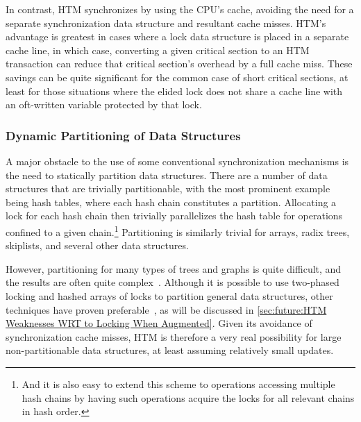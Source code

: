 In contrast, HTM synchronizes by using the CPU's cache, avoiding the need
for a separate synchronization data structure and resultant cache misses.
HTM's advantage is greatest in cases where a lock data structure is
placed in a separate cache line, in which case, converting a given
critical section to an HTM transaction can reduce that critical section's
overhead by a full cache miss.
These savings can be quite significant for the common case of short
critical sections, at least for those situations where the elided lock
does not share a cache line with an oft-written variable protected by
that lock.

\QuickQuizEnd

\subsubsection{Dynamic Partitioning of Data Structures}
\label{sec:future:Dynamic Partitioning of Data Structures}

A major obstacle to the use of some conventional synchronization mechanisms
is the need to statically partition data structures.
There are a number of data structures that are trivially
partitionable, with the most prominent example being hash tables,
where each hash chain constitutes a partition.
Allocating a lock for each hash chain then trivially parallelizes
the hash table for operations confined to a given chain.\footnote{
	And it is also easy to extend this scheme to operations accessing
	multiple hash chains by having such operations acquire the
	locks for all relevant chains in hash order.}
Partitioning is similarly trivial for arrays, radix trees, skiplists, and
several other data structures.

However, partitioning for many types of trees and graphs is quite
difficult, and the results are often quite complex~\cite{Ellis80}.
Although it is possible to use two-phased locking and hashed arrays
of locks to partition general data structures, other techniques
have proven preferable~\cite{DavidSMiller2006HashedLocking},
as will be discussed in
\cref{sec:future:HTM Weaknesses WRT to Locking When Augmented}.
Given its avoidance of synchronization cache misses,
HTM is therefore a very real possibility for large non-partitionable
data structures, at least assuming relatively small updates.


